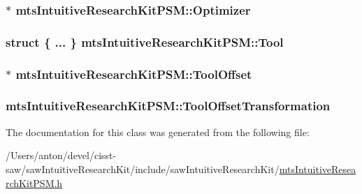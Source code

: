\subsubsection[{Optimizer}]{$\ast$ mts\+Intuitive\+Research\+Kit\+P\+S\+M\+::\+Optimizer\hspace{0.3cm}{\ttfamily [protected]}}\label{classmts_intuitive_research_kit_p_s_m_a3ca72df1e884e0d754b6ac688f0715f0}
\hypertarget{classmts_intuitive_research_kit_p_s_m_a7cd92446ee2c1e08e384798771d26432}{}
\subsubsection[{Tool}]{\setlength{\rightskip}{0pt plus 5cm}struct \{ ... \}   mts\+Intuitive\+Research\+Kit\+P\+S\+M\+::\+Tool\hspace{0.3cm}{\ttfamily [protected]}}\label{classmts_intuitive_research_kit_p_s_m_a7cd92446ee2c1e08e384798771d26432}
\hypertarget{classmts_intuitive_research_kit_p_s_m_ab07541283bf0eee9126789cc3391f46b}{}
\subsubsection[{Tool\+Offset}]{$\ast$ mts\+Intuitive\+Research\+Kit\+P\+S\+M\+::\+Tool\+Offset\hspace{0.3cm}{\ttfamily [protected]}}\label{classmts_intuitive_research_kit_p_s_m_ab07541283bf0eee9126789cc3391f46b}
\hypertarget{classmts_intuitive_research_kit_p_s_m_ac57150a5c372984cffcc8e4f4c8c1203}{}
\subsubsection[{Tool\+Offset\+Transformation}]{ mts\+Intuitive\+Research\+Kit\+P\+S\+M\+::\+Tool\+Offset\+Transformation\hspace{0.3cm}{\ttfamily [protected]}}\label{classmts_intuitive_research_kit_p_s_m_ac57150a5c372984cffcc8e4f4c8c1203}


The documentation for this class was generated from the following file\+:\begin{DoxyCompactItemize}
\item 
/\+Users/anton/devel/cisst-\/saw/saw\+Intuitive\+Research\+Kit/include/saw\+Intuitive\+Research\+Kit/\hyperlink{mts_intuitive_research_kit_p_s_m_8h}{mts\+Intuitive\+Research\+Kit\+P\+S\+M.\+h}\end{DoxyCompactItemize}
